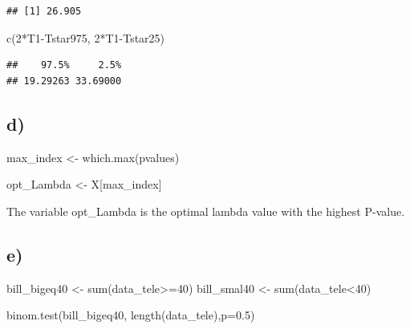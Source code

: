 \documentclass[
]{article}
\newenvironment{Shaded}{\begin{snugshade}}{\end{snugshade}}
\newcommand{\AttributeTok}[1]{\textcolor[rgb]{0.77,0.63,0.00}{#1}}
\newcommand{\DecValTok}[1]{\textcolor[rgb]{0.00,0.00,0.81}{#1}}
\newcommand{\FloatTok}[1]{\textcolor[rgb]{0.00,0.00,0.81}{#1}}
\newcommand{\FunctionTok}[1]{\textcolor[rgb]{0.00,0.00,0.00}{#1}}
\newcommand{\NormalTok}[1]{#1}
\newcommand{\OtherTok}[1]{\textcolor[rgb]{0.56,0.35,0.01}{#1}}
\newcommand{\SpecialCharTok}[1]{\textcolor[rgb]{0.00,0.00,0.00}{#1}}
\begin{document}
\begin{verbatim}
## [1] 26.905
\end{verbatim}

\begin{Shaded}
\begin{Highlighting}[]
\FunctionTok{c}\NormalTok{(}\DecValTok{2}\SpecialCharTok{*}\NormalTok{T1}\SpecialCharTok{{-}}\NormalTok{Tstar975, }\DecValTok{2}\SpecialCharTok{*}\NormalTok{T1}\SpecialCharTok{{-}}\NormalTok{Tstar25)}
\end{Highlighting}
\end{Shaded}

\begin{verbatim}
##    97.5%     2.5% 
## 19.29263 33.69000
\end{verbatim}

\hypertarget{d-1}{%
\subsection{d)}\label{d-1}}

\begin{Shaded}
\begin{Highlighting}[]
\NormalTok{max\_index }\OtherTok{\textless{}{-}} \FunctionTok{which.max}\NormalTok{(pvalues)}

\NormalTok{opt\_Lambda }\OtherTok{\textless{}{-}}\NormalTok{ X[max\_index]}
\end{Highlighting}
\end{Shaded}

The variable opt\_Lambda is the optimal lambda value with the highest
P-value.

\hypertarget{e}{%
\subsection{e)}\label{e}}

\begin{Shaded}
\begin{Highlighting}[]
\NormalTok{bill\_bigeq40 }\OtherTok{\textless{}{-}} \FunctionTok{sum}\NormalTok{(data\_tele}\SpecialCharTok{\textgreater{}=}\DecValTok{40}\NormalTok{)}
\NormalTok{bill\_smal40 }\OtherTok{\textless{}{-}} \FunctionTok{sum}\NormalTok{(data\_tele}\SpecialCharTok{\textless{}}\DecValTok{40}\NormalTok{)}

\FunctionTok{binom.test}\NormalTok{(bill\_bigeq40, }\FunctionTok{length}\NormalTok{(data\_tele),}\AttributeTok{p=}\FloatTok{0.5}\NormalTok{)}
\end{Highlighting}
\end{Shaded}
\end{document}
